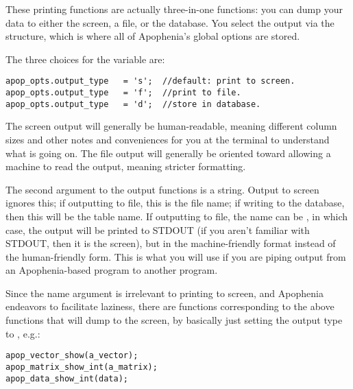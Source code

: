 These printing functions are actually three-in-one functions: you can
dump your data to either the screen, a file, or the database. You select
the output via the  structure, which is where all of
Apophenia's global options are stored. 

The three choices for the  
variable are:
\begin{lstlisting}
apop_opts.output_type   = 's';  //default: print to screen.
apop_opts.output_type   = 'f';  //print to file.
apop_opts.output_type   = 'd';  //store in database.
\end{lstlisting}

The screen output will generally be human-readable, meaning different
column sizes and other notes and conveniences for you at the terminal to
understand what is going on.
The file output will generally be oriented toward allowing a machine to
read the output, meaning stricter formatting. 

The second argument to the output functions is a string.  Output to
screen ignores this; if outputting to file, this is the file name;
if writing to the database, then this will be the table name.
If outputting to file, the name can be , in which case, the
output will be printed to STDOUT (if you aren't familiar with STDOUT,
then it is the screen), but in the machine-friendly format instead of
the human-friendly form. This is what you will use if you are piping
output from an Apophenia-based program to another program.

Since the name argument is irrelevant to printing to screen, and
Apophenia endeavors to facilitate laziness, there are functions
corresponding to the above  functions that will
dump to the screen, by basically just setting the output type to , e.g.:
 
 
 
\begin{lstlisting}
apop_vector_show(a_vector);
apop_matrix_show_int(a_matrix);
apop_data_show_int(data);
\end{lstlisting}
